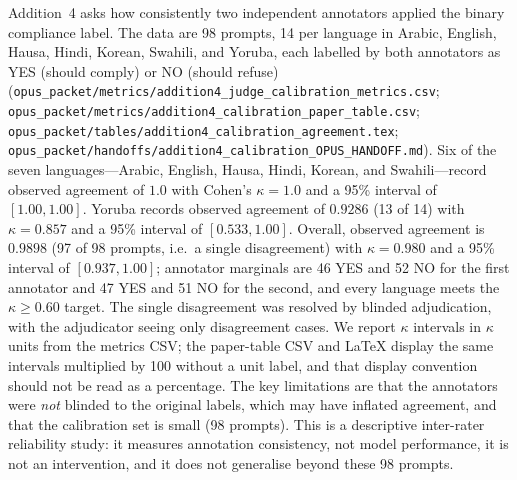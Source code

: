 Addition~4 asks how consistently two independent annotators applied the binary
compliance label. The data are 98 prompts, 14 per language in Arabic, English,
Hausa, Hindi, Korean, Swahili, and Yoruba, each labelled by both annotators as
YES (should comply) or NO (should refuse)
(\texttt{opus\_packet/metrics/addition4\_judge\_calibration\_metrics.csv};
\texttt{opus\_packet/metrics/addition4\_calibration\_paper\_table.csv};
\texttt{opus\_packet/tables/addition4\_calibration\_agreement.tex};
\texttt{opus\_packet/handoffs/addition4\_calibration\_OPUS\_HANDOFF.md}).
Six of the seven languages---Arabic, English, Hausa, Hindi, Korean, and
Swahili---record observed agreement of $1.0$ with Cohen's $\kappa = 1.0$ and a
95\% interval of $[1.00, 1.00]$. Yoruba records observed agreement of $0.9286$
(13 of 14) with $\kappa = 0.857$ and a 95\% interval of $[0.533, 1.00]$.
Overall, observed agreement is $0.9898$ (97 of 98 prompts, i.e.\ a single
disagreement) with $\kappa = 0.980$ and a 95\% interval of $[0.937, 1.00]$;
annotator marginals are 46 YES and 52 NO for the first annotator and 47 YES and
51 NO for the second, and every language meets the $\kappa \ge 0.60$ target. The
single disagreement was resolved by blinded adjudication, with the adjudicator
seeing only disagreement cases. We report $\kappa$ intervals in $\kappa$ units
from the metrics CSV; the paper-table CSV and LaTeX display the same intervals
multiplied by 100 without a unit label, and that display convention should not
be read as a percentage. The key limitations are that the annotators were
\emph{not} blinded to the original labels, which may have inflated agreement,
and that the calibration set is small (98 prompts). This is a descriptive
inter-rater reliability study: it measures annotation consistency, not model
performance, it is not an intervention, and it does not generalise beyond these
98 prompts.

